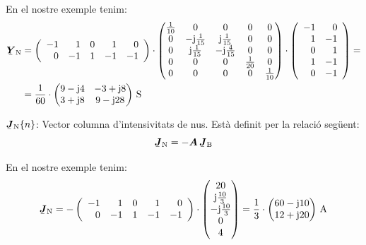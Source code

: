 \begin{list}{}
   En el nostre exemple tenim:
   \[ \begin{split}
      \mcmplx{Y}\ped{N} &=
      \left(\begin{array}{rrrrr} -1 & 1  & 0 &  1 & 0 \\  0 & -1 & 1 & -1 & -1
      \end{array}\right) \cdot
      \begin{pmatrix}
            \frac{1}{10} & 0 & 0 & 0 & 0 \\
            0 & -\ju\frac{1}{15} & \ju\frac{1}{15} & 0 & 0 \\
            0 & \ju\frac{1}{15} & -\ju\frac{4}{15} & 0 & 0 \\
            0 & 0 & 0 & \frac{1}{20} & 0 \\
            0 & 0 & 0 & 0 & \frac{1}{10}
      \end{pmatrix} \cdot
      \left(\begin{array}{rr} -1 & 0 \\ 1  & -1 \\  0 & 1 \\ 1 & -1 \\ 0 & -1
      \end{array}\right) = \\
       &=
      \frac{1}{60} \cdot \begin{pmatrix}
            9 - \ju 4 & -3 + \ju 8 \\
            3 + \ju 8 & 9 - \ju 28
      \end{pmatrix}\unit{S}
   \end{split}  \label{eq:yn}
   \]

   \item[$\mcmplx{J}\ped{N}\{n\}$:] Vector columna d'intensivitats de nus. Est\`{a} definit per la relaci\'{o} seg\"{u}ent:
   \begin{equation}
      \mcmplx{J}\ped{N} = - \boldsymbol{A} \,\mcmplx{J}\ped{B}
   \end{equation}

   En el nostre exemple tenim:
   \[
      \mcmplx{J}\ped{N} = -
      \left(\begin{array}{rrrrr} -1 & 1  & 0 &  1 & 0 \\  0 & -1 & 1 & -1 & -1
      \end{array}\right) \cdot
      \begin{pmatrix} 20 \\ \ju\frac{10}{3} \\ -\ju\frac{10}{3} \\ 0 \\ 4 \end{pmatrix}
      =
      \frac{1}{3} \cdot \begin{pmatrix}
            60 - \ju 10 \\
            12 + \ju 20
      \end{pmatrix}\unit{A}
   \]


\end{list}
